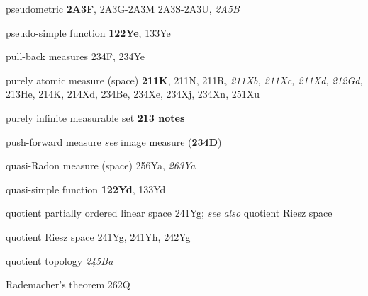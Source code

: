 pseudometric {\bf 2A3F},
2A3G-2A3M 
2A3S-2A3U, 
{\it 2A5B}





pseudo-simple function {\bf 122Ye}, 133Ye



pull-back measures 234F, 234Ye




purely atomic measure (space) {\bf 211K}, 211N, 211R, {\it 211Xb, 211Xc, 211Xd},
{\it 212Gd}, 213He, 214K, 214Xd, 234Be, 234Xe, 234Xj, 234Xn, 251Xu


purely infinite measurable set {\bf 213 notes}




push-forward measure
{\it see} image measure ({\bf 234D})




\indexmedskip
















quasi-Radon measure (space) 256Ya, {\it 263Ya}




quasi-simple function {\bf 122Yd}, 133Yd
















quotient partially ordered linear space 241Yg;
  {\it see also} quotient Riesz space


quotient Riesz space 241Yg, 241Yh, 242Yg






quotient topology {\it 245Ba}


\indexmedskip

Rademacher's theorem 262Q




